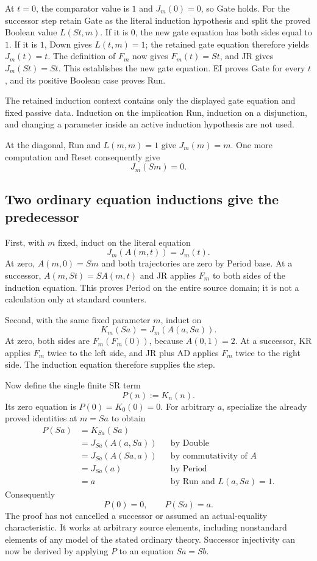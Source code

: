 At $t=0$, the comparator value is $1$ and $J_m(0)=0$, so Gate holds.
For the successor step retain Gate as the literal induction hypothesis
and split the proved Boolean value $L(St,m)$.
If it is $0$, the new gate equation has both sides equal to $1$.
If it is $1$, Down gives $L(t,m)=1$; the retained gate equation
therefore yields $J_m(t)=t$.  The definition of $F_m$ now gives
$F_m(t)=St$, and JR gives $J_m(St)=St$.  This establishes the new
gate equation.  EI proves Gate for every $t$, and its positive Boolean
case proves Run.

The retained induction context contains only the displayed gate
equation and fixed passive data.  Induction on the implication Run,
induction on a disjunction, and changing a parameter inside an active
induction hypothesis are not used.

At the diagonal, Run and $L(m,m)=1$ give $J_m(m)=m$.  One more
computation and Reset consequently give
\[
                          J_m(Sm)=0.
 \tag{Period base}\label{eq:sr-cycle-period-base}
\]

\subsection{Two ordinary equation inductions give the predecessor}

First, with $m$ fixed, induct on the literal equation
\[
                     J_m(A(m,t))=J_m(t).
 \tag{Period}\label{eq:sr-cycle-period}
\]
At zero, $A(m,0)=Sm$ and both trajectories are zero by Period base.
At a successor, $A(m,St)=S A(m,t)$ and JR applies $F_m$ to both
sides of the induction equation.  This proves Period on the entire
source domain; it is not a calculation only at standard counters.

Second, with the same fixed parameter $m$, induct on
\[
                  K_m(Sa)=J_m(A(a,Sa)).
 \tag{Double}\label{eq:sr-cycle-double}
\]
At zero, both sides are $F_m(F_m(0))$, because $A(0,1)=2$.
At a successor, KR applies $F_m$ twice to the left side, and JR plus
AD applies $F_m$ twice to the right side.  The induction equation
therefore supplies the step.

Now define the single finite SR term
\[
                              P(n):=K_n(n).
 \tag{P}\label{eq:sr-predecessor-term}
\]
Its zero equation is $P(0)=K_0(0)=0$.  For arbitrary $a$, specialize
the already proved identities at $m=Sa$ to obtain
\[
\begin{aligned}
 P(Sa)
 &=K_{Sa}(Sa)\\
 &=J_{Sa}(A(a,Sa)) &&\text{by Double}\\
 &=J_{Sa}(A(Sa,a)) &&\text{by commutativity of }A\\
 &=J_{Sa}(a)       &&\text{by Period}\\
 &=a              &&\text{by Run and }L(a,Sa)=1.
\end{aligned}
\]
Consequently
\[
                         \boxed{P(0)=0,\qquad P(Sa)=a.}
 \tag{Predecessor}\label{eq:sr-predecessor}
\]
The proof has not cancelled a successor or assumed an actual-equality
characteristic.  It works at arbitrary source elements, including
nonstandard elements of any model of the stated ordinary theory.
Successor injectivity can now be derived by applying $P$ to an equation
$Sa=Sb$.

